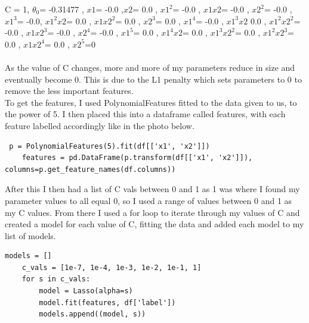\documentclass[11pt]{article} %
\begin{document}
 C = 1, \(\theta_0\)= -0.31477 , \(x1\)= -0.0 ,\(x2\)= 0.0 , \(x1^2\)= -0.0 , \(x1 x2\)= -0.0 , \(x2^2\)= -0.0 , \(x1^3\)= -0.0, \(x1^2 x2\)= 0.0 , \(x1 x2^2\)= 0.0 , \(x2^3\)= 0.0 , \(x1^4\)= -0.0 , \(x1^3 x2\) 0.0 , \(x1^2 x2^2\)= -0.0 , \(x1 x2^3\)= -0.0 , \(x2^4\)= -0.0 , \(x1^5\)= 0.0 , \(x1^4 x2\)= 0.0 , \(x1^3 x2^2\)= 0.0 , \(x1^2 x2^3\)= 0.0 , \(x1 x2^4\)= 0.0 , \(x2^5\)=0 \\\\



As the value of C changes, more and more of my parameters reduce in size and eventually become 0. This is due to the L1 penalty which sets parameters to 0 to remove the less important features.
\\To get the features, I used PolynomialFeatures fitted to the data given to us, to the power of 5. I then placed this into a dataframe called features, with each feature labelled accordingly like in the photo below.
\begin{verbatim}
 p = PolynomialFeatures(5).fit(df[['x1', 'x2']])
    features = pd.DataFrame(p.transform(df[['x1', 'x2']]), columns=p.get_feature_names(df.columns))
\end{verbatim}
After this I then had a list of C vals between 0 and 1 as 1 was where I found my parameter values to all equal 0, so I used a range of values between 0 and 1 as my C values. From there I used a for loop to iterate through my values of C and created a model for each value of C, fitting the data and added each model to my list of models. 
\begin{verbatim}
models = []
    c_vals = [1e-7, 1e-4, 1e-3, 1e-2, 1e-1, 1]
    for s in c_vals:
        model = Lasso(alpha=s)
        model.fit(features, df['label'])
        models.append((model, s))
\end{verbatim}
\newpage
\end{document}
